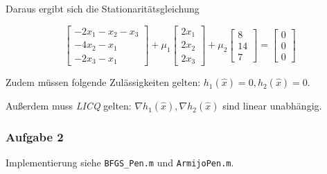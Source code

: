 \documentclass[a4paper, 12pt]{report}
\begin{document}
Daraus ergibt sich die Stationaritätsgleichung

$$\begin{bmatrix}-2x_1 - x_2 - x_3\\-4x_2 - x_1\\-2x_3-x_1\end{bmatrix} + \mu_1 \begin{bmatrix}2x_1\\2x_2\\2x_3\end{bmatrix} + \mu_2 \begin{bmatrix}8\\14\\7\end{bmatrix} = \begin{bmatrix}0\\0\\0\end{bmatrix}$$

Zudem müssen folgende Zulässigkeiten gelten: $h_1(\hat{x}) = 0, h_2(\hat{x}) = 0$.

Außerdem muss \textit{LICQ} gelten: $\nabla h_1(\hat{x}), \nabla h_2(\hat{x})$ sind linear unabhängig.

\subsubsection{Aufgabe 2}
Implementierung siehe \lstinline[basicstyle=\ttfamily\color{black}]|BFGS_Pen.m| und
\lstinline[basicstyle=\ttfamily\color{black}]|ArmijoPen.m|.
\end{document}

